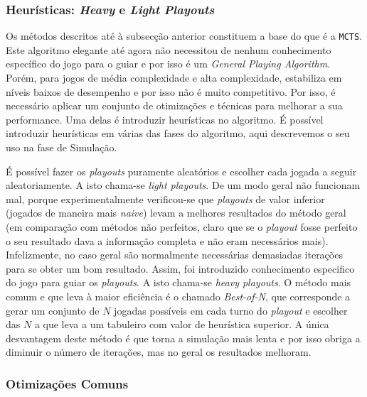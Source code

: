 \documentclass[12pt,a4paper,oneside]{article}
\begin{document}
\subsubsection{Heurísticas: \textit{Heavy} e \textit{Light} \textit{Playouts}}

Os métodos descritos até à subsecção anterior constituem a base do que
é a \texttt{MCTS}. Este algoritmo elegante até agora não necessitou de
nenhum conhecimento específico do jogo para o guiar e por isso é um
\textit{General Playing Algorithm}. Porém, para jogos de média
complexidade e alta complexidade, estabiliza em níveis baixos de
desempenho e por isso não é muito competitivo. Por isso, é necessário
aplicar um conjunto de otimizações e técnicas para melhorar a sua
performance. Uma delas é introduzir heurísticas no algoritmo. É
possível introduzir heurísticas em várias das fases do algoritmo, aqui
descrevemos o seu uso na fase de Simulação.

É possível fazer os \textit{playouts} puramente aleatórios e escolher
cada jogada a seguir aleatoriamente. A isto chama-se \textit{light
  playouts}. De um modo geral não funcionam mal, porque
experimentalmente verificou-se que \textit{playouts} de valor inferior
(jogados de maneira mais \textit{naive}) levam a melhores resultados
do método geral (em comparação com métodos não perfeitos, claro que se
o \textit{playout} fosse perfeito o seu resultado dava a informação
completa e não eram necessários mais). Infelizmente, no caso geral são
normalmente necessárias demasiadas iterações para se obter um bom
resultado. Assim, foi introduzido conhecimento especifico do jogo para
guiar os \textit{playouts}. A isto chama-se \textit{heavy playouts}. O
método mais comum e que leva à maior eficiência é o chamado
\textit{Best-of-N}, que corresponde a gerar um conjunto de $N$ jogadas
possíveis em cada turno do \textit{playout} e escolher das $N$ a que
leva a um tabuleiro com valor de heurística superior. A única
desvantagem deste método é que torna a simulação mais lenta e por isso
obriga a diminuir o número de iterações, mas no geral os resultados
melhoram.

\subsubsection{Otimizações Comuns}
\label{sec:mcopt}

\end{document}
